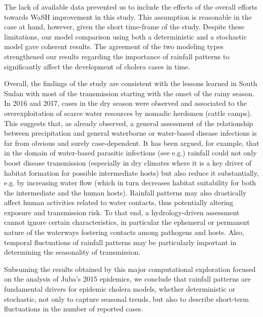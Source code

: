 The lack of available data prevented us to include the effects of the overall efforts towards WaSH improvement in this study. This assumption is reasonable in the case at hand, however, given the short time-frame of the study. %
Despite these limitations, our model comparison using both a deterministic and a stochastic model gave coherent results. The agreement of the two modeling types strengthened our results regarding the importance of rainfall patterns to significantly affect the development of cholera cases in time.

Overall, the findings of the study are consistent with the lessons learned in South Sudan with most of the transmission starting with the onset of the rainy season. In 2016 and 2017, cases in the dry season were observed and associated to the overexploitation of scarce water resources by nomadic herdsmen (cattle camps). This suggests that, as already observed, a general assessment of the relationship between precipitation and general waterborne or water-based disease infections is far from obvious and surely case-dependent. It has been argued, for example, that in the domain of water-based parasitic infections (see e.g.\cite[-6\baselineskip]{McCreesh:ChallengesPredictingEffects:2013,Rinaldo:ModelingKeyDrivers:2017}) rainfall could not only boost disease transmission (especially in dry climates where it is a key driver of habitat formation for possible intermediate hosts) but also reduce it substantially, e.g. by increasing water flow (which in turn decreases habitat suitability for both the intermediate and the human hosts). Rainfall patterns may also drastically affect human activities related to water contacts, thus potentially altering exposure and transmission risk\cite{Lai:SpatialDistributionSchistosomiasis:2015}. To that end, a hydrology-driven assessment cannot ignore certain characteristics, in particular the ephemeral or permanent nature of the waterways fostering contacts among pathogens and hosts\cite{Perez-Saez:HydrologyDensityFeedbacks:2016}. Also, temporal fluctuations of rainfall patterns may be particularly important in determining the seasonality of transmission\cite{Bertuzzo:HydroclimatologyDualpeakAnnual:2012,Bertuzzo:PredictionSpatialEvolution:2011,McCreesh:PredictingEffectsClimate:2015,Perez-Saez:HydrologyDensityFeedbacks:2016}.


Subsuming the results obtained by this major computational exploration focused on the analysis of Juba's 2015 epidemics, we conclude that rainfall patterns are fundamental drivers for epidemic cholera models, whether deterministic or stochastic, not only to capture seasonal trends, but also to describe short-term fluctuations in the number of reported cases. 


